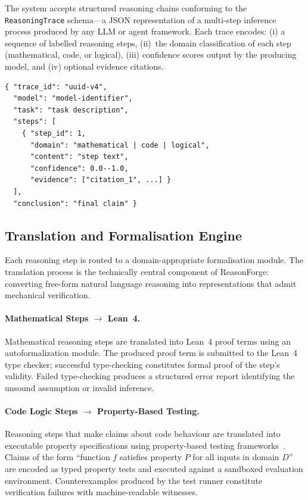 \documentclass[11pt,a4paper]{article}
\begin{document}
The system accepts structured reasoning chains conforming to the
\texttt{ReasoningTrace} schema---a JSON representation of a multi-step
inference process produced by any LLM or agent framework.  Each trace
encodes: (i) a sequence of labelled reasoning steps, (ii)~the domain
classification of each step (mathematical, code, or logical), (iii)
confidence scores output by the producing model, and (iv) optional
evidence citations.

\begin{lstlisting}[language={},caption={ReasoningTrace input schema.},
  label=lst:trace]
{ "trace_id": "uuid-v4",
  "model": "model-identifier",
  "task": "task description",
  "steps": [
    { "step_id": 1,
      "domain": "mathematical | code | logical",
      "content": "step text",
      "confidence": 0.0--1.0,
      "evidence": ["citation_1", ...] }
  ],
  "conclusion": "final claim" }
\end{lstlisting}

\subsection{Translation and Formalisation Engine}
\label{sec:translation}

Each reasoning step is routed to a domain-appropriate formalisation
module.  The translation process is the technically central component of
ReasonForge: converting free-form natural language reasoning into
representations that admit mechanical verification.

\paragraph{Mathematical Steps $\rightarrow$ Lean~4.}
Mathematical reasoning steps are translated into Lean~4 proof terms using
an autoformalization module.  The produced proof term is submitted to the
Lean~4 type checker; successful type-checking constitutes formal proof of
the step's validity.  Failed type-checking produces a structured error
report identifying the unsound assumption or invalid inference.

\paragraph{Code Logic Steps $\rightarrow$ Property-Based Testing.}
Reasoning steps that make claims about code behaviour are translated into
executable property specifications using property-based testing
frameworks~\citep{hypothesis2019}.  Claims of the form ``function $f$
satisfies property $P$ for all inputs in domain $D$'' are encoded as
typed property tests and executed against a sandboxed evaluation
environment.  Counterexamples produced by the test runner constitute
verification failures with machine-readable witnesses.
\end{document}
